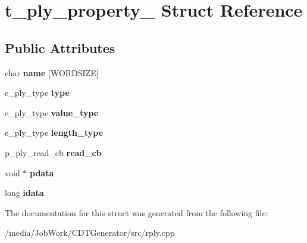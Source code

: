 \hypertarget{structt__ply__property__}{\section{t\-\_\-ply\-\_\-property\-\_\- Struct Reference}
\label{structt__ply__property__}
}
\subsection*{Public Attributes}
\begin{DoxyCompactItemize}
\item 
\hypertarget{structt__ply__property___a9093045e79e9eafa04d290b7bdc2e83b}{char {\bfseries name} \mbox{[}W\-O\-R\-D\-S\-I\-Z\-E\mbox{]}}\label{structt__ply__property___a9093045e79e9eafa04d290b7bdc2e83b}

\item 
\hypertarget{structt__ply__property___a7021be56bf6726be847887cfbba0d24e}{e\-\_\-ply\-\_\-type {\bfseries type}}\label{structt__ply__property___a7021be56bf6726be847887cfbba0d24e}

\item 
\hypertarget{structt__ply__property___a3caa07217f713492cf06016c7654e87f}{e\-\_\-ply\-\_\-type {\bfseries value\-\_\-type}}\label{structt__ply__property___a3caa07217f713492cf06016c7654e87f}

\item 
\hypertarget{structt__ply__property___af9b3b45ae24c1fd7d9d81a18bc3f76a7}{e\-\_\-ply\-\_\-type {\bfseries length\-\_\-type}}\label{structt__ply__property___af9b3b45ae24c1fd7d9d81a18bc3f76a7}

\item 
\hypertarget{structt__ply__property___af139cc44e475f4754daf7501e1288716}{p\-\_\-ply\-\_\-read\-\_\-cb {\bfseries read\-\_\-cb}}\label{structt__ply__property___af139cc44e475f4754daf7501e1288716}

\item 
\hypertarget{structt__ply__property___af53fa1cccd547dddd25d2ea111fd3159}{void $\ast$ {\bfseries pdata}}\label{structt__ply__property___af53fa1cccd547dddd25d2ea111fd3159}

\item 
\hypertarget{structt__ply__property___a87447519f61802d3c7a4fef1024c1d03}{long {\bfseries idata}}\label{structt__ply__property___a87447519f61802d3c7a4fef1024c1d03}

\end{DoxyCompactItemize}


The documentation for this struct was generated from the following file\-:\begin{DoxyCompactItemize}
\item 
/media/\-Job\-Work/\-C\-D\-T\-Generator/src/rply.\-cpp\end{DoxyCompactItemize}
